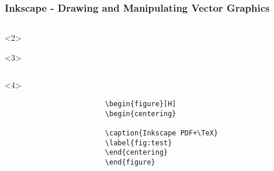 \documentclass{beamer}
\begin{document}
        \begin{frame}[t,fragile]
            \frametitle{Inkscape - Drawing and Manipulating Vector Graphics}
            \begin{columns}[onlytextwidth]
                \begin{column}[T]{0.75\textwidth}
                    \begin{onlyenv}<2>
                        
                    \end{onlyenv}
                    \begin{onlyenv}<3>
                        \inputminted[firstline=27,lastline=46]{latex}{\assetPath/Images/InkscapeDemo/Acorn-RiscPC-LaTeX.pdf_tex}
                    \end{onlyenv}
                    \begin{onlyenv}<4>
                        \begin{verbatim}
                        \begin{figure}[H]
                        \begin{centering}
                        
                        \caption{Inkscape PDF+\TeX}
                        \label{fig:test}
                        \end{centering}
                        \end{figure}
                        \end{verbatim}
                    \end{onlyenv}
\end{column}
\end{columns}
\end{frame}
\end{document}
